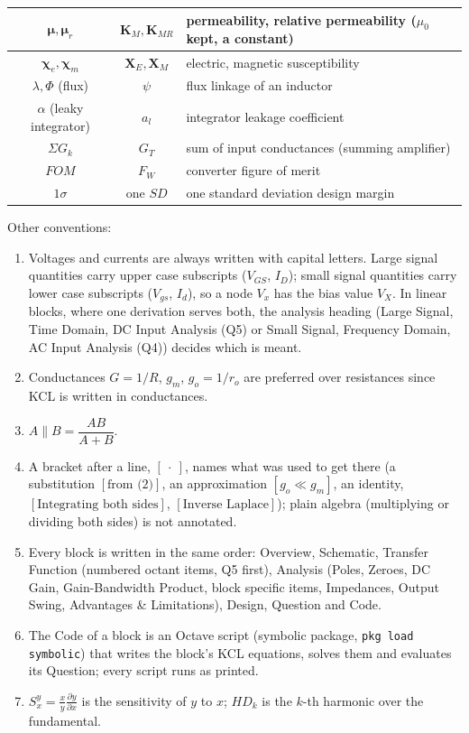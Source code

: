 \begin{table}[H]
\begin{tabular}{|c|c|l|}
    \(\boldsymbol{\mu}, \boldsymbol{\mu}_r\) & \(\mathbf{K}_M, \mathbf{K}_{MR}\) & permeability, relative permeability (\(\mu_0\) kept, a constant) \\ \hline
    \(\boldsymbol{\chi}_e, \boldsymbol{\chi}_m\) & \(\mathbf{X}_E, \mathbf{X}_M\) & electric, magnetic susceptibility \\ \hline
    \(\lambda, \Phi\) (flux) & \(\psi\) & flux linkage of an inductor \\ \hline
    \(\alpha\) (leaky integrator) & \(a_l\) & integrator leakage coefficient \\ \hline
    \(\Sigma G_k\) & \(G_T\) & sum of input conductances (summing amplifier) \\ \hline
    \(FOM\) & \(F_W\) & converter figure of merit \\ \hline
    \(1\sigma\) & one \(SD\) & one standard deviation design margin \\ \hline
  \end{tabular}
\end{table}
\noindent Other conventions:
\begin{enumerate}
  \item Voltages and currents are always written with capital letters.
    Large signal quantities carry upper case subscripts (\(V_{GS}\),
    \(I_D\)); small signal quantities carry lower case subscripts
    (\(V_{gs}\), \(I_d\)), so a node \(V_x\) has the bias value \(V_X\). In linear
    blocks, where one derivation serves both, the analysis heading (Large
    Signal, Time Domain, DC Input Analysis (Q5) or Small Signal, Frequency
    Domain, AC Input Analysis (Q4)) decides which is meant.
  \item Conductances \(G = 1/R\), \(g_m\), \(g_o = 1/r_o\) are preferred
    over resistances since KCL is written in conductances.
  \item \(A \parallel B = \dfrac{AB}{A + B}\).
  \item A bracket after a line, \([\ \cdot\ ]\), names what was used to get there (a substitution
    \([\text{from (2)}]\), an approximation \([g_o \ll g_m]\), an identity, \([\text{Integrating both sides}]\),
    \([\text{Inverse Laplace}]\)); plain algebra (multiplying or dividing both sides) is not annotated.
  \item Every block is written in the same order: Overview, Schematic, Transfer Function
    (numbered octant items, Q5 first), Analysis (Poles, Zeroes, DC Gain, Gain-Bandwidth Product,
    block specific items, Impedances, Output Swing, Advantages \& Limitations), Design, Question
    and Code.
  \item The Code of a block is an Octave script (symbolic package, \texttt{pkg load symbolic}) that
    writes the block's KCL equations, solves them and evaluates its Question; every script runs
    as printed.
  \item \(S_x^y = \frac{x}{y}\frac{\partial y}{\partial x}\) is the sensitivity of \(y\) to \(x\); \(HD_k\) is the \(k\)-th harmonic over the
    fundamental.
\end{enumerate}

